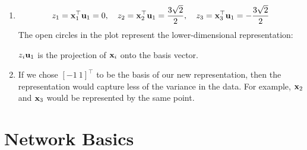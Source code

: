 \documentclass[11pt,letterpaper]{article}
\begin{document}
\begin{solution}
\begin{enumerate}
\begin{center}
\begin{tikzpicture}[x=1cm,y=1cm]
\end{tikzpicture}
\end{center}
\item 
\[ z_1 = \boldx_1^\top \boldu_1 = 0, \quad z_2 = \boldx_2^\top \boldu_1 = \frac{3\sqrt{2}}{2}, \quad z_3 = \boldx_3^\top \boldu_1 = -\frac{3\sqrt{2}}{2} \]
The open circles in the plot represent the lower-dimensional representation:
\begin{center}
\end{center}
$z_i \boldu_1$ is the projection of $\boldx_i$ onto the basis vector.

\item If we chose $[-1 \ 1]^\top$ to be the basis of our new representation, then the representation would capture less of the variance in the data. For example, $\boldx_2$ and $\boldx_3$ would be represented by the same point.
\end{enumerate}
\end{solution}
\newpage
\section{Network Basics}
\end{document}
